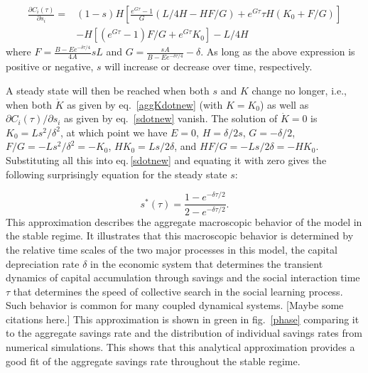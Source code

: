 \begin{align}
  \frac{\partial C_i(\tau)}{\partial s_i} = &(1 - s) H\left[
        \frac{e^{G\tau} - 1}{G}(L / 4 H - H F/G) + e^{G\tau}\tau H (K_0 + F/G)\right] \nonumber \\
    &- H[(e^{G\tau} - 1) F/G + e^{G\tau} K_0] 
    - L / 4 H
    \label{sdotnew}
\end{align}
where
$F = \frac{B - E e^{-\delta \tau/4}}{4 A} s L$
and
$G = \frac{s A}{B - E e^{-\delta \tau/4}} - \delta$.
As long as the above expression is positive or negative, $s$ will increase or decrease over time, respectively.

A steady state will then be reached when both $s$ and $K$ change no longer, i.e., when both $\dot K$ as given by eq.~\eqref{aggKdotnew} (with $K=K_0$) as well as $\partial C_i(\tau)/\partial s_i$ as given by eq.~\eqref{sdotnew}
vanish.
The solution of $\dot K = 0$ is 
$K_0 = L s^2 / \delta^2$, 
at which point we have
$E = 0$,
$H = \delta / 2 s$, 
$G = - \delta / 2$, 
$F/G = - L s^2 / \delta^2 = - K_0$, 
$H K_0 = L s / 2 \delta$, and
$H F / G = - L s / 2 \delta = - H K_0$.
Substituting all this into eq.\,\eqref{sdotnew} and equating it with zero gives the following surprisingly equation for the steady state $s$:

\begin{equation}
\label{eq:s_optimal}
s^\ast(\tau) = \frac{1 - e^{-\delta \tau/2}}{2 - e^{-\delta \tau/2}}.
\end{equation}
This approximation describes the aggregate macroscopic behavior of the model in the stable regime. It illustrates that this macroscopic behavior is determined by the relative time scales of the two major processes in this model, the capital depreciation rate $\delta$ in the economic system that determines the transient dynamics of capital accumulation through savings and the social interaction time $\tau$ that determines the speed of collective search in the social learning process. Such behavior is common for many coupled dynamical systems. [Maybe some citations here.] This approximation is shown in green in fig.~\ref{phase} comparing it to the aggregate savings rate and the distribution of individual savings rates from numerical simulations. This shows that this analytical approximation provides a good fit of the aggregate savings rate throughout the stable regime.

